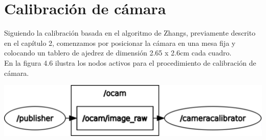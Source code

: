 
\section{Calibración de cámara}
Siguiendo la calibración basada en el algoritmo de Zhangs, previamente descrito en el capítulo 2,
comenzamos por posicionar la cámara en una mesa fija y colocando un tablero de ajedrez de dimensión
2.65 x 2.6cm cada cuadro.\\ En la figura 4.6 ilustra los nodos activos para el procedimiento de calibración 
de cámara.
\begin{center}
	\includegraphics[width=0.8 \textwidth]{Contenido/Cuerpo/Capitulo4/Fig11.eps}
	\label{Fig1}
\end{center}

